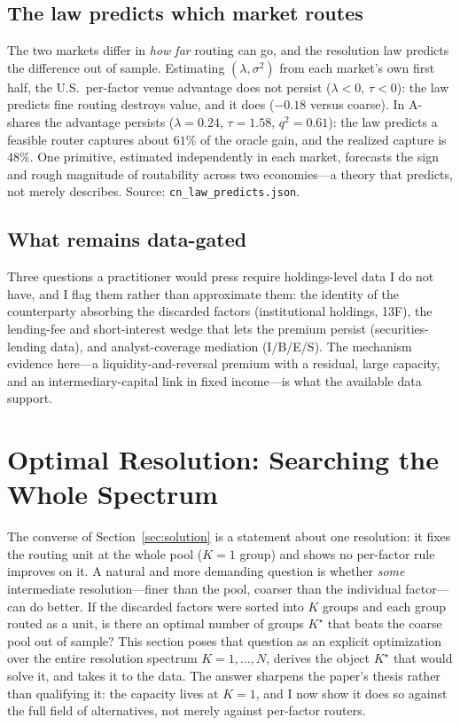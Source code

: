 \documentclass[12pt]{article}
\theoremstyle{plain}
\theoremstyle{definition}
\begin{document}
\subsection{The law predicts which market routes}
The two markets differ in \emph{how far} routing can go, and the resolution law
predicts the difference out of sample. Estimating $(\lambda,\sigma^2)$ from each
market's own first half, the U.S.\ per-factor venue advantage does not persist
($\lambda<0$, $\tau<0$): the law predicts fine routing destroys value, and it
does ($-0.18$ versus coarse). In A-shares the advantage persists ($\lambda=0.24$,
$\tau=1.58$, $q^2=0.61$): the law predicts a feasible router captures about
$61\%$ of the oracle gain, and the realized capture is $48\%$. One primitive,
estimated independently in each market, forecasts the sign and rough magnitude of
routability across two economies---a theory that predicts, not merely describes.
Source: \texttt{cn\_law\_predicts.json}.

\subsection{What remains data-gated}
Three questions a practitioner would press require holdings-level data I do not
have, and I flag them rather than approximate them: the identity of the
counterparty absorbing the discarded factors (institutional holdings, 13F), the
lending-fee and short-interest wedge that lets the premium persist (securities-
lending data), and analyst-coverage mediation (I/B/E/S). The mechanism evidence
here---a liquidity-and-reversal premium with a residual, large capacity, and an
intermediary-capital link in fixed income---is what the available data support.

\section{Optimal Resolution: Searching the Whole Spectrum}
\label{sec:kstar}

The converse of Section~\ref{sec:solution} is a statement about one resolution:
it fixes the routing unit at the whole pool ($K=1$ group) and shows no
per-factor rule improves on it. A natural and more demanding question is whether
\emph{some} intermediate resolution---finer than the pool, coarser than the
individual factor---can do better. If the discarded factors were sorted into $K$
groups and each group routed as a unit, is there an optimal number of groups
$K^\star$ that beats the coarse pool out of sample? This section poses that
question as an explicit optimization over the entire resolution spectrum
$K=1,\dots,N$, derives the object $K^\star$ that would solve it, and takes it to
the data. The answer sharpens the paper's thesis rather than qualifying it: the
capacity lives at $K=1$, and I now show it does so against the full field of
alternatives, not merely against per-factor routers.
\end{document}
